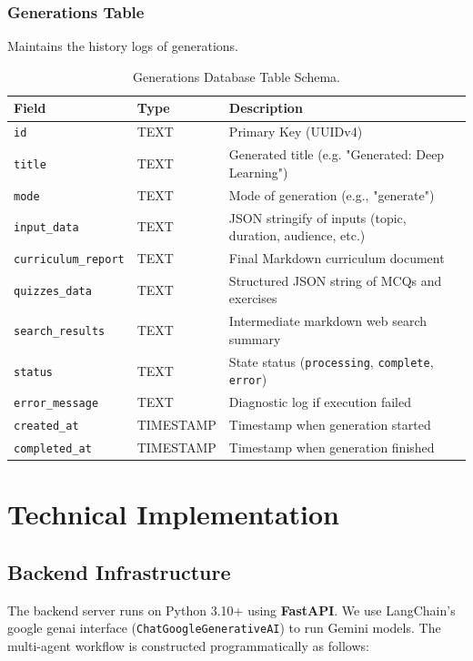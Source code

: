 \documentclass[12pt,a4paper]{report}
\begin{document}
\subsection{Generations Table}
Maintains the history logs of generations.
\begin{table}[h]
\centering
\begin{tabular}{lll}
\toprule
\textbf{Field} & \textbf{Type} & \textbf{Description} \\
\midrule
\texttt{id} & TEXT & Primary Key (UUIDv4) \\
\texttt{title} & TEXT & Generated title (e.g. "Generated: Deep Learning") \\
\texttt{mode} & TEXT & Mode of generation (e.g., "generate") \\
\texttt{input\_data} & TEXT & JSON stringify of inputs (topic, duration, audience, etc.) \\
\texttt{curriculum\_report} & TEXT & Final Markdown curriculum document \\
\texttt{quizzes\_data} & TEXT & Structured JSON string of MCQs and exercises \\
\texttt{search\_results} & TEXT & Intermediate markdown web search summary \\
\texttt{status} & TEXT & State status (\texttt{processing}, \texttt{complete}, \texttt{error}) \\
\texttt{error\_message} & TEXT & Diagnostic log if execution failed \\
\texttt{created\_at} & TIMESTAMP & Timestamp when generation started \\
\texttt{completed\_at} & TIMESTAMP & Timestamp when generation finished \\
\bottomrule
\end{tabular}
\caption{Generations Database Table Schema.}
\label{tab:generations_schema}
\end{table}

\chapter{Technical Implementation}
\label{ch:implementation}

\section{Backend Infrastructure}
The backend server runs on Python 3.10+ using \textbf{FastAPI}. We use LangChain's google genai interface (\texttt{ChatGoogleGenerativeAI}) to run Gemini models. The multi-agent workflow is constructed programmatically as follows:
\end{document}
